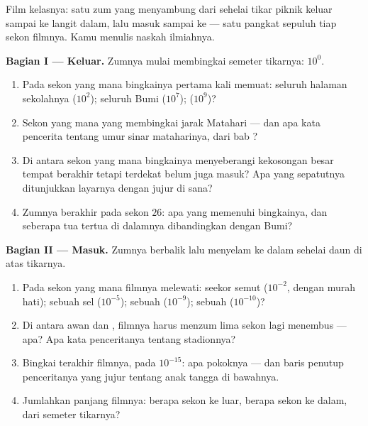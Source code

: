 \begin{problem}\label{pb:g9:atoms-to-galaxies:1}
Film kelasnya: satu zum yang menyambung dari sehelai tikar piknik
keluar sampai ke langit dalam, lalu masuk sampai ke  --- satu
pangkat sepuluh tiap sekon filmnya. Kamu menulis naskah ilmiahnya.

\medskip\noindent\textbf{Bagian I --- Keluar.}
Zumnya mulai membingkai semeter tikarnya: $10^{0}$.
\begin{enumerate}
  \item Pada sekon yang mana bingkainya pertama kali memuat: seluruh
        halaman sekolahnya ($10^{2}$); seluruh Bumi ($10^{7}$); 
         ($10^{9}$)?
  \item Sekon yang mana yang membingkai jarak Matahari --- dan apa
        kata pencerita tentang umur sinar mataharinya, dari bab
        ?
  \item Di antara sekon yang mana bingkainya menyeberangi kekosongan
        besar tempat  berakhir tetapi  terdekat
        belum juga masuk? Apa yang sepatutnya ditunjukkan layarnya
        dengan jujur di sana?
  \item Zumnya berakhir pada sekon $26$: apa yang memenuhi bingkainya,
        dan seberapa tua  tertua di dalamnya dibandingkan dengan
        Bumi?
\end{enumerate}

\medskip\noindent\textbf{Bagian II --- Masuk.}
Zumnya berbalik lalu menyelam ke dalam sehelai daun di atas tikarnya.
\begin{enumerate}[resume]
  \item Pada sekon yang mana filmnya melewati: seekor semut
        ($10^{-2}$, dengan murah hati); sebuah sel ($10^{-5}$); sebuah
         ($10^{-9}$); sebuah  ($10^{-10}$)?
  \item Di antara awan   dan , filmnya harus
        menzum lima sekon lagi menembus --- apa? Apa kata penceritanya
        tentang stadionnya?
  \item Bingkai terakhir filmnya, pada $10^{-15}$: apa pokoknya ---
        dan baris penutup penceritanya yang jujur tentang anak tangga
        di bawahnya.
  \item Jumlahkan panjang filmnya: berapa sekon ke luar, berapa sekon
        ke dalam, dari semeter tikarnya?
\end{enumerate}


\end{problem}
